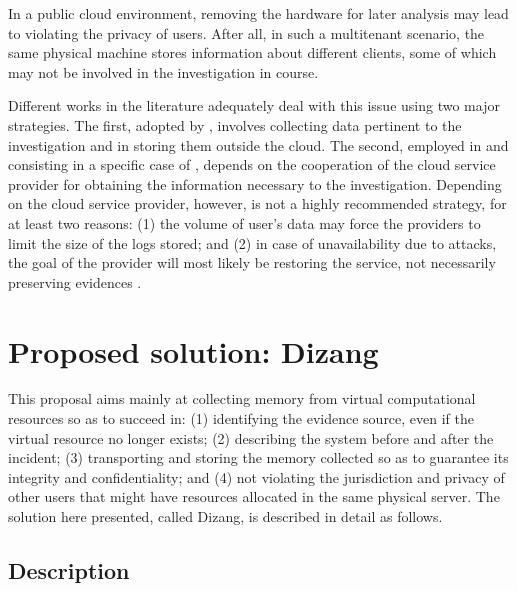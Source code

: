 \documentclass[conference]{IEEEtran}
\newcommand{\fancyname}{Dizang }
\begin{document}
In a public cloud environment, removing the hardware for later analysis may lead to violating the privacy of users.
%
After all, in such a multitenant scenario, the same physical machine stores information about different clients, some of which may not be involved in the investigation in course.


Different works in the literature adequately deal with this issue using two major strategies.
%
The first, adopted by \cite{Reichert_Auto_acquisition:2015,George_DF2CE:2012,Poisel_VMI:2013,Dykstra_FROST:2013}, involves collecting data pertinent to the investigation and in storing them outside the cloud.
%
The second, employed in \cite{Sang_Log_approach:2013} and consisting in a specific case of \cite{George_DF2CE:2012}, depends on the cooperation of the cloud service provider for obtaining the information necessary to the investigation. 
%
Depending on the cloud service provider, however, is not a highly recommended strategy, for at least two reasons: 
(1) the volume of user's data may force the providers to limit the size of the logs stored; and 
(2) in case of unavailability due to attacks, the goal of the provider will most likely be restoring the service, not necessarily preserving evidences \cite{Clarke_Review_of_Challenges:2015}. 


\section{Proposed solution: \fancyname}
\label{sec:proposal}

This proposal aims mainly at collecting memory from virtual computational resources so as to succeed in: 
(1) identifying the evidence source, even if the virtual resource no longer exists; 
(2) describing the system before and after the incident;
(3) transporting and storing the memory collected so as to guarantee its integrity and confidentiality; and
(4) not violating the jurisdiction and privacy of other users that might have resources allocated in the same physical server.
%
The solution here presented, called Dizang, is described in detail as follows.


\subsection{Description}
\label{sec:proposal-desc}
\end{document}

